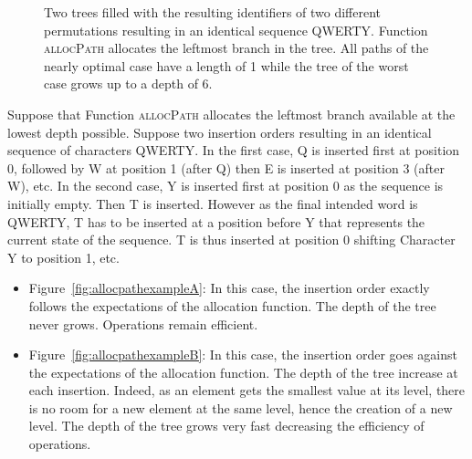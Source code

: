 \begin{figure*}
  \centering
  \hspace{50pt}
  \caption{\label{fig:allocpathexample} Two trees filled with the resulting
    identifiers of two different permutations resulting in an identical sequence
    QWERTY. Function \textsc{allocPath} allocates the leftmost branch in the
    tree. All paths of the nearly optimal case have a length of 1 while the tree
    of the worst case grows up to a depth of 6.}
\end{figure*}

Suppose that Function \textsc{allocPath} allocates the leftmost branch available
at the lowest depth possible. Suppose two insertion orders resulting in an
identical sequence of characters QWERTY.  In the first case, Q is inserted first
at position 0, followed by W at position 1 (after Q) then E is inserted at
position 3 (after W), etc.  In the second case, Y is inserted first at position
0 as the sequence is initially empty. Then T is inserted. However as the final
intended word is QWERTY, T has to be inserted at a position before Y that
represents the current state of the sequence. T is thus inserted at position 0
shifting Character Y to position 1, etc.


\begin{itemize}[noitemsep, leftmargin=*]
\item Figure~\ref{fig:allocpathexampleA}: In this case, the insertion order
  exactly follows the expectations of the allocation function. The depth of the
  tree never grows. Operations remain efficient.

\item Figure~\ref{fig:allocpathexampleB}: In this case, the insertion order goes
  against the expectations of the allocation function. The depth of the tree
  increase at each insertion. Indeed, as an element gets the smallest value at
  its level, there is no room for a new element at the same level, hence the
  creation of a new level. The depth of the tree grows very fast decreasing the
  efficiency of operations.
\end{itemize}

